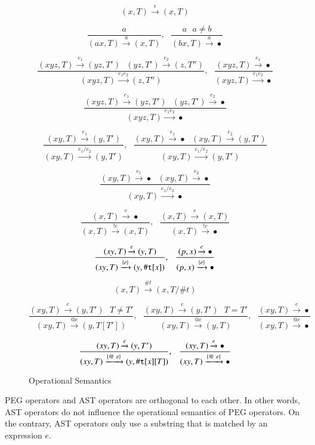 \documentclass[JIP]{ipsj}
\begin{document}
\begin{figure}[tb]

{\small 
\[
     (x, T)  \xrightarrow{\epsilon} (x, T) 
\]

\[
\frac{a}
     { (ax, T)  \xrightarrow{a} (x, T)  } 
, ~~~
\frac{a ~~~ a \ne b}
     { (bx, T)  \xrightarrow{a} \bullet  } 
\]

\[
\frac{(xyz, T) \xrightarrow{e_1} (yz, T') ~~~ (yz, T')  \xrightarrow{e_2} (z, T'') }
     { (xyz, T)  \xrightarrow{e_1 e_2} (z, T'')  }
, ~~~
\frac{(xyz, T) \xrightarrow{e_1} \bullet }
     { (xyz, T)  \xrightarrow{e_1 e_2} \bullet  } 
\]

\[
\frac{ (xyz, T) \xrightarrow{e_1} (yz, T') ~~~ (yz, T')  \xrightarrow{e_2} \bullet }
     { (xyz, T)  \xrightarrow{e_1 e_2} \bullet  } 
\]

\[
\frac{(xy, T) \xrightarrow{e_1} (y, T')  }
     { (xy, T)  \xrightarrow{e_1 / e_2} (y, T')  } 
, ~~~
\frac{(xy, T) \xrightarrow{e_1} \bullet ~~~ (xy, T)  \xrightarrow{e_2} (y, T') }
     { (xy, T)  \xrightarrow{e_1 / e_2} (y, T')  } 
\]

\[
\frac{(xy, T) \xrightarrow{e_1} \bullet ~~~ (xy, T)  \xrightarrow{e_2} \bullet }
     { (xy, T)  \xrightarrow{e_1 / e_2} \bullet  } 
\]

\[
\frac{(x, T) \xrightarrow{e} \bullet }
     { (x, T)  \xrightarrow{!e} (x, T)  } 
, ~~~
\frac{(x, T) \xrightarrow{e} (x, T) }
     { (x, T)  \xrightarrow{!e} \bullet  }      
\]

\[
\frac{(xy, T) \xrightarrow{e} (y, T) }
     { (xy, T)  \xrightarrow{\{ e \}} (y, \#{\tt t}[x])  } 
, ~~~
\frac{(p, x) \xrightarrow{e} \bullet }
     { (p, x)  \xrightarrow{\{ e \}} \bullet  }      
\]

\[
      (x, T)  \xrightarrow{\#t} (x, T/\#t)
\]

\[
\frac{(xy, T) \xrightarrow{e} (y, T') ~~~ T \ne T' }
     { (xy, T)  \xrightarrow{@e} (y, T[T'])  } 
, ~~~
\frac{(xy, T) \xrightarrow{e} (y, T') ~~~ T = T' }
     { (xy, T)  \xrightarrow{@e} (y, T)  } 
, ~~~
\frac{(xy, T) \xrightarrow{e} \bullet }
     { (xy, T)  \xrightarrow{@e} \bullet  }      
\]

\[
\frac{(xy, T) \xrightarrow{e} (y, T') }
     { (xy, T)  \xrightarrow{\{@ ~ e\}} (y, \#{\tt t}[x][T])  } 
, ~~~
\frac{(xy, T) \xrightarrow{e} \bullet }
     { (xy, T)  \xrightarrow{\{@ ~ e\}} \bullet  }      
\]

}
\caption{Operational Semantics}
\label{fig:sem}
\end{figure}

PEG operators and AST operators are orthogonal to each other. In other words, AST operators do not influence the operational semantics of PEG operators. On the contrary, AST operators only use a substring that is matched by an expression $e$.
\end{document}
